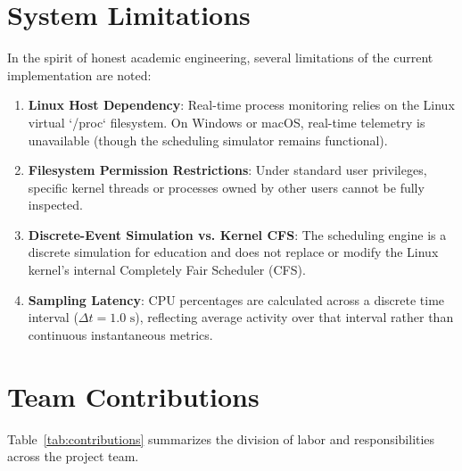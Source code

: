 \documentclass[12pt,a4paper]{article}
\begin{document}
\section{System Limitations}
In the spirit of honest academic engineering, several limitations of the current implementation are noted:
\begin{enumerate}
    \item \textbf{Linux Host Dependency}: Real-time process monitoring relies on the Linux virtual `/proc` filesystem. On Windows or macOS, real-time telemetry is unavailable (though the scheduling simulator remains functional).
    \item \textbf{Filesystem Permission Restrictions}: Under standard user privileges, specific kernel threads or processes owned by other users cannot be fully inspected.
    \item \textbf{Discrete-Event Simulation vs. Kernel CFS}: The scheduling engine is a discrete simulation for education and does not replace or modify the Linux kernel's internal Completely Fair Scheduler (CFS).
    \item \textbf{Sampling Latency}: CPU percentages are calculated across a discrete time interval ($\Delta t = 1.0\text{ s}$), reflecting average activity over that interval rather than continuous instantaneous metrics.
\end{enumerate}

\section{Team Contributions}
Table~\ref{tab:contributions} summarizes the division of labor and responsibilities across the project team.
\end{document}
